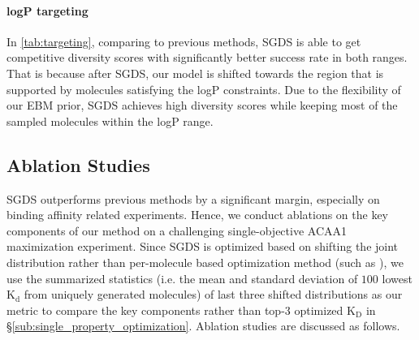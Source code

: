 \documentclass[accepted]{uai2023} %
\newcommand{\mysecref}[1]{\S\ref{#1}}
\begin{document}
\paragraph{logP targeting}
In \cref{tab:targeting}, comparing to previous methods, SGDS is able to get competitive diversity scores with significantly better success rate in both ranges. That is because after SGDS, our model is shifted towards the region that is supported by molecules satisfying the logP constraints. Due to the flexibility of our EBM prior, SGDS achieves high diversity scores while keeping most of the sampled molecules within the logP range.
\begin{table}[h]
\caption{logP targeting to a certain range~\citep{eckmann2022limo,you2018graph,luo2021graphdf,xie2021mars}.}
\label{tab:targeting}
\centering
{}
\end{table}

\subsection{Ablation Studies}
SGDS outperforms previous methods by a significant margin, especially on binding affinity related experiments. Hence, we conduct ablations on the key components of our method on a challenging single-objective  ACAA1 maximization experiment. Since SGDS is optimized based on shifting the joint distribution rather than per-molecule based optimization method (such as \citep{eckmann2022limo}), we use the summarized statistics (i.e. the mean and standard deviation of $100$ lowest $\mathrm{K_d}$ from uniquely generated molecules) of last three shifted distributions as our metric to compare the key components rather than top-3 optimized $\mathrm{K_D}$ in \mysecref{sub:single_property_optimization}. Ablation studies are discussed as follows.
\end{document}
